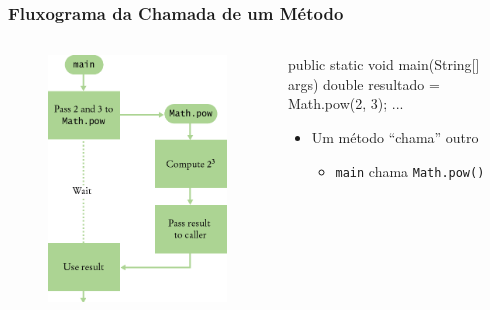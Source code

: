 \documentclass[xcolor={dvipsnames,table},aspectratio=169]{beamer}
\begin{document}
\begin{frame}[fragile]\frametitle{Fluxograma da Chamada de um Método}
\begin{columns}[T]
	\begin{column}{0.5\linewidth}
\begin{figure}[h]
	\includegraphics[height=0.65\paperheight,center]{pucrs-ep-fprog-unidade_05-metodos-laminas-fluxograma_metodo.png}
\end{figure}
	\end{column}
	\begin{column}{0.5\linewidth}
{\scriptsize
\begin{javacode}
public static void main(String[] args) {
  double resultado = Math.pow(2, 3);
  ...
}
\end{javacode}
}
		\begin{itemize}
			\item Um método ``chama'' outro
			\begin{itemize}
				\item \texttt{main} chama \texttt{Math.pow()}

\end{itemize}
\end{itemize}
\end{column}
\end{columns}
\end{frame}
\end{document}
